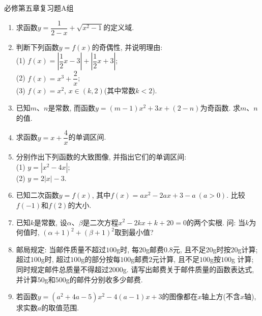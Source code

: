 \documentclass[10pt,a4paper]{article}
\begin{document}
必修第五章复习题A组
\begin{enumerate}[1.]

\item 求函数$y=\dfrac1{2-x}+\sqrt{x^2-1}$的定义域.
\vspace*{3cm}
\item 判断下列函数$y=f(x)$的奇偶性, 并说明理由:\\
(1) $f(x)=|\dfrac 12 x-3|+|\dfrac 12 x+3|$;\\
(2) $f(x)=x^3+\dfrac 2x$;\\
(3) $f(x)=x^2$, $x\in (k, 2)$(其中常数$k<2$).
\vspace*{3cm}
\item 已知$m$、$n$是常数, 而函数$y=(m-1)x^2+3x+(2-n)$为奇函数. 求$m$、$n$的值.
\vspace*{3cm}
\item 求函数$y=x+\dfrac 4x$的单调区间.
\vspace*{3cm}
\item 分别作出下列函数的大致图像, 并指出它们的单调区间:\\
(1) $y=|x^2-4x|$;\\
(2) $y=2|x|-3$.
\vspace*{3cm}
\item 已知二次函数$y=f(x)$, 其中$f(x)=ax^2-2ax+3-a \ (a>0)$. 比较$f(-1)$和$f(2)$的大小.
\vspace*{3cm}
\item 已知$k$是常数, 设$\alpha$、$\beta$是二次方程$x^2-2kx+k+20=0$的两个实根. 问: 当$k$为
何值时, $(\alpha+1)^2+(\beta+1)^2$取到最小值?
\vspace*{3cm}
\item 邮局规定: 当邮件质量不超过$100$g时, 每$20$g邮费$0.8$元, 且不足$20$g时按$20$g计算; 超过$100$g时, 超过$100$g的部分按每$100$g邮费$2$元计算, 且不足$100$g按$100$g
计算; 同时规定邮件总质量不得超过$2000$g. 请写出邮费关于邮件质量的函数表达式, 并计算$50$g和$500$g的邮件分别收多少邮费.
\vspace*{3cm}
\item 若函数$y=(a^2+4a-5)x^2-4(a-1)x+3$的图像都在$x$轴上方(不含$x$轴), 求实数$a$的取值范围.
\vspace*{3cm}
\end{enumerate}
\end{document}
